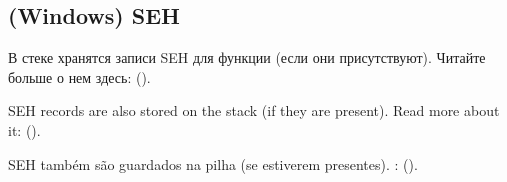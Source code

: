 \subsection{(Windows) SEH}

\ifdefined\RUSSIAN
В стеке хранятся записи \ac{SEH} для функции (если они присутствуют).
Читайте больше о нем здесь: ().
\fi %

\ifdefined\ENGLISH
\ac{SEH} records are also stored on the stack (if they are present).
Read more about it: ().
\fi %

\ifdefined\BRAZILIAN
\ac{SEH} também são guardados na pilha (se estiverem presentes).
\PTBRph{}: ().
\fi %

